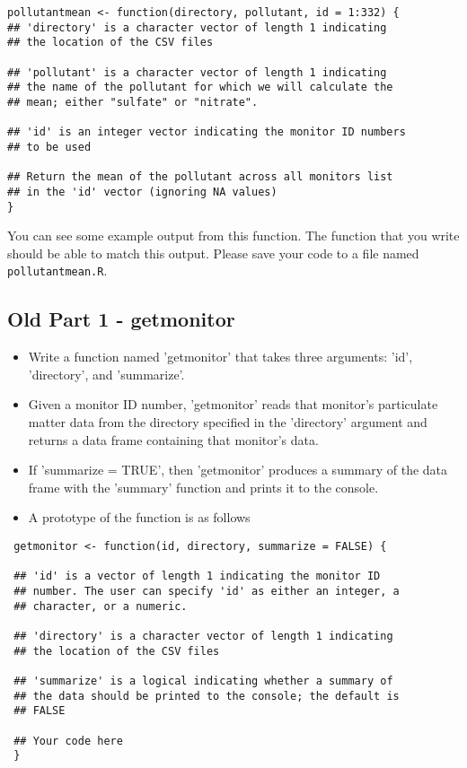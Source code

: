 \documentclass[]{article}
\begin{document}
\begin{framed}
\begin{verbatim}
pollutantmean <- function(directory, pollutant, id = 1:332) {
## 'directory' is a character vector of length 1 indicating
## the location of the CSV files

## 'pollutant' is a character vector of length 1 indicating
## the name of the pollutant for which we will calculate the
## mean; either "sulfate" or "nitrate".

## 'id' is an integer vector indicating the monitor ID numbers
## to be used

## Return the mean of the pollutant across all monitors list
## in the 'id' vector (ignoring NA values)
}
\end{verbatim}
\end{framed}
You can see some example output from this function. The function that you write should be able to match this output. Please save your code to a file named \texttt{pollutantmean.R}.

\newpage
\subsection{Old Part 1 - getmonitor}
 \begin{itemize}
\item Write a function named 'getmonitor' that takes three arguments: 'id', 'directory', and 'summarize'. \item Given a monitor ID number, 'getmonitor' reads that monitor's particulate matter data from the directory specified in the 'directory' argument and returns a data frame containing that monitor's data. 
 \item If 'summarize = TRUE', then 'getmonitor' produces a summary of the data frame with the 'summary' function and prints it to the console. \item A prototype of the function is as follows
 \end{itemize}
 \begin{framed}
 \begin{verbatim}
 getmonitor <- function(id, directory, summarize = FALSE) {
 
 ## 'id' is a vector of length 1 indicating the monitor ID
 ## number. The user can specify 'id' as either an integer, a
 ## character, or a numeric.
         
 ## 'directory' is a character vector of length 1 indicating
 ## the location of the CSV files
 
 ## 'summarize' is a logical indicating whether a summary of
 ## the data should be printed to the console; the default is
 ## FALSE
      
 ## Your code here
 }
 \end{verbatim}
 \end{framed}
 \newpage
\end{document}
